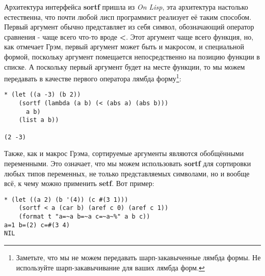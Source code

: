 Архитектура интерфейса \textbf{sortf} пришла из \emph{On Lisp}, эта архитектура настолько естественна, что почти любой лисп программист реализует её таким способом. Первый аргумент обычно представляет из себя символ, обозначающий оператор сравнения - чаще всего что-то вроде \textbf{<}. Этот аргумент чаще всего функция, но, как отмечает Грэм, первый аргумент может быть и макросом, и специальной формой, поскольку аргумент помещается непосредственно на позицию функции в списке. А поскольку первый аргумент будет на месте функции, то мы можем передавать в качестве первого оператора лямбда форму\footnote{Заметьте, что мы не можем передавать шарп-закавыченные лямбда формы. Не используйте шарп-закавычивание для ваших лямбда форм.}:

\begin{verbatim}
* (let ((a -3) (b 2))
    (sortf (lambda (a b) (< (abs a) (abs b)))
      a b)
    (list a b))

(2 -3)
\end{verbatim}

Также, как и макрос Грэма, сортируемые аргументы являются обобщёнными переменными. Это означает, что мы можем использовать \textbf{sortf} для сортировки любых типов переменных, не только представляемых символами, но и вообще всё, к чему можно применить \textbf{setf}. Вот пример:

\begin{verbatim}
* (let ((a 2) (b '(4)) (c #(3 1)))
    (sortf < a (car b) (aref c 0) (aref c 1))
    (format t "a=~a b=~a c=~a~%" a b c))
a=1 b=(2) c=#(3 4)
NIL
\end{verbatim}

